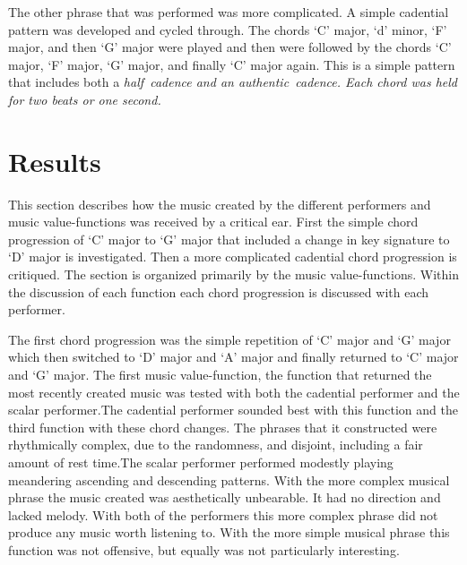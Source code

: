 \documentclass[12pt]{ucthesis}
\begin{document}
The other phrase that was performed was more complicated. A simple cadential pattern was developed and cycled through. The chords `C' major, `d' minor, `F' major, and then `G' major were played and then were followed by the chords `C' major, `F' major, `G' major, and finally `C' major again. This is a simple pattern that includes both a \em{half}~\em cadence and an \em{authentic}~\em cadence. Each chord was held for two beats or one second.

\chapter{Results}
\label{results}
This section describes how the music created by the different performers and music value-functions was received by a critical ear. First the simple chord progression of `C' major to `G' major that included a change in key signature to `D' major is investigated. Then a more complicated cadential chord progression is critiqued. The section is organized primarily by the music value-functions. Within the discussion of each function each chord progression is discussed with each performer. 

The first chord progression was the simple repetition of `C' major and `G' major which then switched to `D' major and `A' major and finally returned to `C' major and `G' major. The first music value-function, the function that returned the most recently created music was tested with both the cadential performer and the scalar performer.The cadential performer sounded best with this function and the third function with these chord changes. The phrases that it constructed were rhythmically complex, due to the randomness, and disjoint, including a fair amount of rest time.The scalar performer performed modestly playing meandering ascending and descending patterns. With the more complex musical phrase the music created was aesthetically unbearable. It had no direction and lacked melody. With both of the performers this more complex phrase did not produce any music worth listening to. With the more simple musical phrase this function was not offensive, but equally was not particularly interesting.
\end{document}
